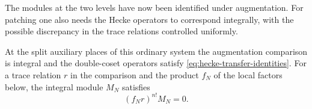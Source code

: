 The modules at the two levels have now been identified under augmentation. For patching one also needs the Hecke operators to correspond integrally, with the possible discrepancy in the trace relations controlled uniformly.

\begin{proposition}\label{prop:ordinary-integral-transfer}
At the split auxiliary places of this ordinary system the
augmentation comparison is integral and the double-coset
operators satisfy \eqref{eq:hecke-transfer-identities}.
For a trace relation \(r\) in the comparison and the product
\(f_N\) of the local factors below, the integral module \(M_N\) satisfies 
\[
 (f_Nr)^{n!}M_N=0.
\]

\end{proposition}


